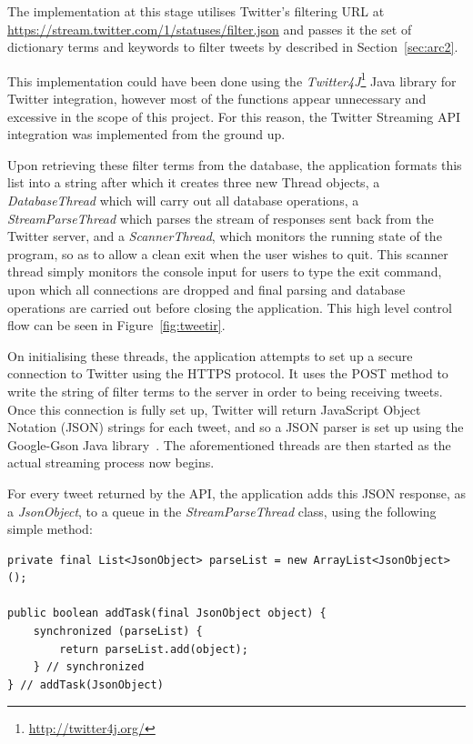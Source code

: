 The implementation at this stage utilises Twitter's filtering URL at \url{https://stream.twitter.com/1/statuses/filter.json} and passes it the set of dictionary terms and keywords to filter tweets by described in Section~\ref{sec:arc2}.

This implementation could have been done using the \emph{Twitter4J}\footnote{\url{http://twitter4j.org/}} Java library for Twitter integration, however most of the functions appear unnecessary and excessive in the scope of this project. For this reason, the Twitter Streaming API integration was implemented from the ground up.

Upon retrieving these filter terms from the database, the application formats this list into a string after which it creates three new Thread objects, a \emph{DatabaseThread} which will carry out all database operations, a \emph{StreamParseThread} which parses the stream of responses sent back from the Twitter server, and a \emph{ScannerThread}, which monitors the running state of the program, so as to allow a clean exit when the user wishes to quit. This scanner thread simply monitors the console input for users to type the exit command, upon which all connections are dropped and final parsing and database operations are carried out before closing the application. This high level control flow can be seen in Figure~\ref{fig:tweetir}.

On initialising these threads, the application attempts to set up a secure connection to Twitter using the HTTPS protocol. It uses the POST method to write the string of filter terms to the server in order to being receiving tweets. Once this connection is fully set up, Twitter will return JavaScript Object Notation (JSON) strings for each tweet, and so a JSON parser is set up using the Google-Gson Java library~\cite{gson}. The aforementioned threads are then started as the actual streaming process now begins.

For every tweet returned by the API, the application adds this JSON response, as a \emph{JsonObject}, to a queue in the \emph{StreamParseThread} class, using the following simple method:
\begin{lstlisting}[caption=Adding tweets to a parse queue, label=lst:queue]
private final List<JsonObject> parseList = new ArrayList<JsonObject>();

public boolean addTask(final JsonObject object) {
    synchronized (parseList) {
        return parseList.add(object);
    } // synchronized
} // addTask(JsonObject)
\end{lstlisting}

